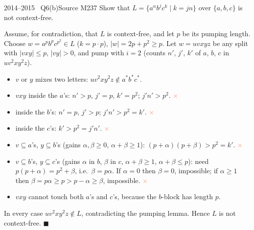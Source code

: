 \documentclass[11pt,a4paper]{article}
\newcommand{\no}{\textcolor{coral}{\ensuremath{\times}}}
\begin{document}
\begin{question}{2014--2015 \textbullet\ Q6(b)}{Source M23}{7}
Show that $L=\{a^nb^jc^k\mid k=jn\}$ over $\{a,b,c\}$ is not context-free.
\end{question}
\begin{solution}
Assume, for contradiction, that $L$ is context-free, and let $p$ be its pumping length. Choose $w=a^pb^pc^{p^2}\in L$ ($k=p\cdot p$), $|w|=2p+p^2\ge p$. Let $w=uvxyz$ be any split with $|vxy|\le p$, $|vy|>0$, and pump with $i=2$ (counts $n'$, $j'$, $k'$ of $a$, $b$, $c$ in $uv^2xy^2z$).
\begin{itemize}
\item $v$ or $y$ mixes two letters: $uv^2xy^2z\notin a^*b^*c^*$.
\item $vxy$ inside the $a$'s: $n'>p$, $j'=p$, $k'=p^2$; $j'n'>p^2$. \no
\item inside the $b$'s: $n'=p$, $j'>p$; $j'n'>p^2=k'$. \no
\item inside the $c$'s: $k'>p^2=j'n'$. \no
\item $v\subseteq a$'s, $y\subseteq b$'s (gains $\alpha,\beta\ge0$, $\alpha+\beta\ge1$): $(p+\alpha)(p+\beta)>p^2=k'$. \no
\item $v\subseteq b$'s, $y\subseteq c$'s (gains $\alpha$ in $b$, $\beta$ in $c$, $\alpha+\beta\ge1$, $\alpha+\beta\le p$): need $p(p+\alpha)=p^2+\beta$, i.e.\ $\beta=p\alpha$. If $\alpha=0$ then $\beta=0$, impossible; if $\alpha\ge1$ then $\beta=p\alpha\ge p>p-\alpha\ge\beta$, impossible. \no
\item $vxy$ cannot touch both $a$'s and $c$'s, because the $b$-block has length $p$.
\end{itemize}
In every case $uv^2xy^2z\notin L$, contradicting the pumping lemma. Hence $L$ is not context-free. \hfill$\blacksquare$
\end{solution}
\end{document}
